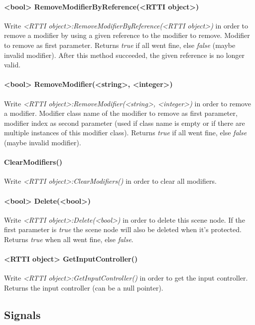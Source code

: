 \paragraph{<bool> RemoveModifierByReference(<RTTI object>)}
Write \emph{<RTTI object>:RemoveModifierByReference(<RTTI object>)} in order to remove a modifier by using a given reference to the modifier to remove. Modifier to remove as first parameter. Returns \emph{true} if all went fine, else \emph{false} (maybe invalid modifier). After this method succeeded, the given reference is no longer valid.

\paragraph{<bool> RemoveModifier(<string>, <integer>)}
Write \emph{<RTTI object>:RemoveModifier(<string>, <integer>)} in order to remove a modifier. Modifier class name of the modifier to remove as first parameter, modifier index as second parameter (used if class name is empty or if there are multiple instances of this modifier class). Returns \emph{true} if all went fine, else \emph{false} (maybe invalid modifier).

\paragraph{ClearModifiers()}
Write \emph{<RTTI object>:ClearModifiers()} in order to clear all modifiers.

\paragraph{<bool> Delete(<bool>)}
Write \emph{<RTTI object>:Delete(<bool>)} in order to delete this scene node. If the first parameter is \emph{true} the scene node will also be deleted when it's protected. Returns \emph{true} when all went fine, else \emph{false}.

\paragraph{<RTTI object> GetInputController()}
Write \emph{<RTTI object>:GetInputController()} in order to get the input controller. Returns the input controller (can be a null pointer).


\subsection{Signals}

